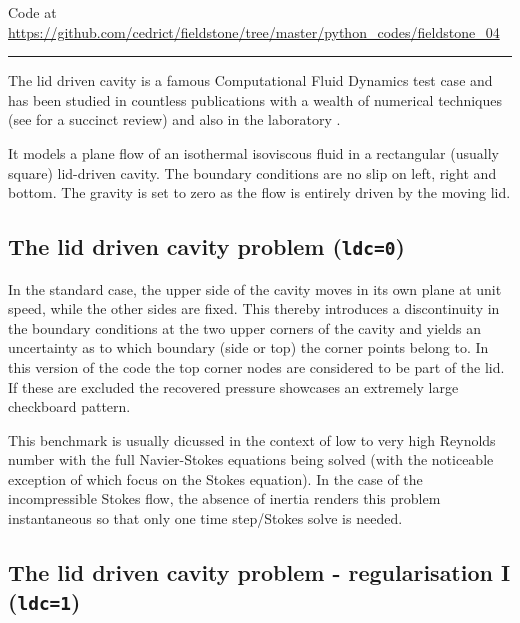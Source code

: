

\begin{center}
Code at \url{https://github.com/cedrict/fieldstone/tree/master/python_codes/fieldstone_04}
\end{center}

\par\noindent\rule{\textwidth}{0.4pt}

The lid driven cavity is a famous Computational Fluid Dynamics test case 
\cite{kawa61,ghgs82,paac67,bope98,brsa06,grdn97,shde00}
and has been studied in countless publications with a wealth of numerical techniques
(see \cite{ertu09} for a succinct review) and also in the laboratory \cite{kost84}.

It models a plane flow of an isothermal isoviscous fluid in a rectangular (usually square) lid-driven cavity. 
The boundary conditions are no slip on left, right and bottom. The gravity is set to zero as the flow
is entirely driven by the moving lid.

\subsection*{The lid driven cavity problem ({\tt ldc=0})}
In the standard case, the upper side of the cavity moves in its own plane at unit speed, while the other sides are fixed.
This thereby introduces a discontinuity in the boundary conditions at the two upper corners of the cavity and yields
an uncertainty as to which boundary (side or top) the corner points belong to. 
In this version of the code the top corner nodes are considered to be part of the lid. If these are excluded 
the recovered pressure showcases an extremely large checkboard pattern.

This benchmark is usually dicussed in the context of low to very high Reynolds number with the full 
Navier-Stokes equations being solved (with the noticeable exception of \cite{sagl81a,sagl81b,chpc95,eid2005}
which focus on the Stokes equation). 
In the case of the incompressible Stokes flow, 
the absence of inertia renders this problem instantaneous so that only one time step/Stokes solve is needed.

\subsection*{The lid driven cavity problem - regularisation I ({\tt ldc=1})}


